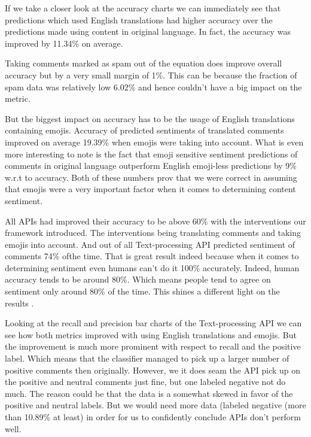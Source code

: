 If we take a closer look at the accuracy charts we can immediately see that predictions which used English translations had higher accuracy over the predictions made using content in original language. 
In fact, the accuracy was improved by 11.34\% on average.

Taking comments marked as spam out of the equation does improve overall accuracy but by a very small margin of 1\%. 
This can be because the fraction of spam data was relatively low  6.02\% and hence couldn't have a big impact on the metric.

But the biggest impact on accuracy has to be the usage of English translations containing emojis. 
Accuracy of predicted sentiments of translated comments improved on average 19.39\% when emojis were taking into account. 
What is even more interesting to note is the fact that emoji sensitive sentiment predictions of comments in original language outperform English emoji-less predictions by 9\% w.r.t to accuracy.
Both of these numbers prov that we were correct in assuming that emojis were a very important factor when it comes to determining content sentiment.

All APIs had improved their accuracy to be above 60\% with the interventions our framework introduced. 
The interventions being translating comments and taking emojis into account. 
And out of all Text-processing API predicted sentiment of comments 74\% ofthe time.
That is great result indeed because when it comes to determining sentiment even humans can't do it 100\% accurately. 
Indeed, human accuracy tends to be around 80\%. 
Which means people tend to agree on sentiment only around 80\% of the time. 
This shines a different light on the results \cite{80PercentAccuracy}. 

Looking at the recall and precision bar charts of the Text-processing API 
we can see how both metrics improved with using English translations and emojis.
But the improvement is much more prominent with respect to recall and the positive label. 
Which means that the classifier managed to pick up a larger number of positive comments then originally.
However, we it does seam the API pick up on the positive and neutral comments just fine, but one labeled negative not do much. 
The reason could be that the data is a somewhat skewed in favor of the positive and neutral labels. But we would need more data (labeled negative (more than 10.89\% at least) in order for us to confidently conclude APIs don't perform well.



